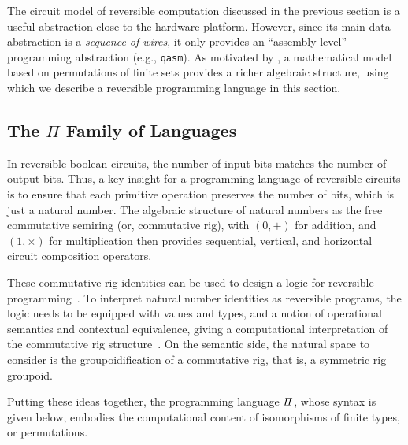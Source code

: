 The circuit model of reversible computation discussed in the previous section is a useful abstraction close to the
hardware platform. However, since its main data abstraction is a \emph{sequence of wires}, it only provides an
``assembly-level'' programming abstraction (e.g., \verb|qasm|). As motivated by \citet{LAFONT2003257}, a mathematical
model based on permutations of finite sets provides a richer algebraic structure, using which we describe a reversible
programming language in this section.

\subsection{The $\Pi$ Family of Languages}
\label{sec:langRev-examples}
\label{examples}

In reversible boolean circuits, the number of input bits matches the number of output bits. Thus, a key insight for a
programming language of reversible circuits is to ensure that each primitive operation preserves the number of bits,
which is just a natural number. The algebraic structure of natural numbers as the free commutative semiring (or,
commutative rig), with $(0,+)$ for addition, and $(1,\times)$ for multiplication then provides sequential, vertical, and
horizontal circuit composition operators.

These commutative rig identities can be used to design a logic for reversible
programming~\cite*{sparksSuperstructuralReversibleLogic2014}. To interpret natural number identities as reversible programs,
the logic needs to be equipped with values and types, and a notion of operational semantics and contextual equivalence,
giving a computational interpretation of the commutative rig structure~\cite{jamesInformationEffects2012}. On the
semantic side, the natural space to consider is the groupoidification of a commutative rig, that is, a symmetric rig
groupoid.

Putting these ideas together, the programming language $\mathit{\Pi}$, whose syntax is given below, embodies the
computational content of isomorphisms of finite types, or permutations.


